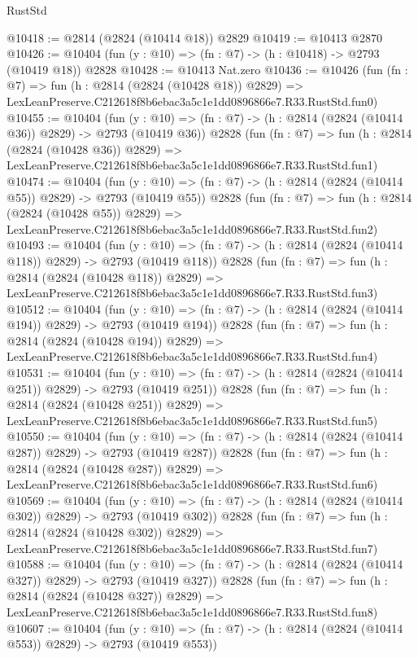 \begin{lexlean}{RustStd}
\begin{coremodule}
@10418 := @2814 (@2824 (@10414 @18)) @2829
@10419 := @10413 @2870
@10426 := @10404 (fun (y : @10) => (fn : @7) -> (h : @10418) -> @2793 (@10419 @18)) @2828
@10428 := @10413 Nat.zero
@10436 := @10426
    (fun (fn : @7) =>
    fun (h : @2814 (@2824 (@10428 @18)) @2829) =>
    LexLeanPreserve.C212618f8b6ebac3a5c1e1dd0896866e7.R33.RustStd.fun0)
@10455 := @10404
    (fun (y : @10) => (fn : @7) -> (h : @2814 (@2824 (@10414 @36)) @2829) -> @2793 (@10419 @36))
    @2828
    (fun (fn : @7) =>
    fun (h : @2814 (@2824 (@10428 @36)) @2829) =>
    LexLeanPreserve.C212618f8b6ebac3a5c1e1dd0896866e7.R33.RustStd.fun1)
@10474 := @10404
    (fun (y : @10) => (fn : @7) -> (h : @2814 (@2824 (@10414 @55)) @2829) -> @2793 (@10419 @55))
    @2828
    (fun (fn : @7) =>
    fun (h : @2814 (@2824 (@10428 @55)) @2829) =>
    LexLeanPreserve.C212618f8b6ebac3a5c1e1dd0896866e7.R33.RustStd.fun2)
@10493 := @10404
    (fun (y : @10) => (fn : @7) -> (h : @2814 (@2824 (@10414 @118)) @2829) -> @2793 (@10419 @118))
    @2828
    (fun (fn : @7) =>
    fun (h : @2814 (@2824 (@10428 @118)) @2829) =>
    LexLeanPreserve.C212618f8b6ebac3a5c1e1dd0896866e7.R33.RustStd.fun3)
@10512 := @10404
    (fun (y : @10) => (fn : @7) -> (h : @2814 (@2824 (@10414 @194)) @2829) -> @2793 (@10419 @194))
    @2828
    (fun (fn : @7) =>
    fun (h : @2814 (@2824 (@10428 @194)) @2829) =>
    LexLeanPreserve.C212618f8b6ebac3a5c1e1dd0896866e7.R33.RustStd.fun4)
@10531 := @10404
    (fun (y : @10) => (fn : @7) -> (h : @2814 (@2824 (@10414 @251)) @2829) -> @2793 (@10419 @251))
    @2828
    (fun (fn : @7) =>
    fun (h : @2814 (@2824 (@10428 @251)) @2829) =>
    LexLeanPreserve.C212618f8b6ebac3a5c1e1dd0896866e7.R33.RustStd.fun5)
@10550 := @10404
    (fun (y : @10) => (fn : @7) -> (h : @2814 (@2824 (@10414 @287)) @2829) -> @2793 (@10419 @287))
    @2828
    (fun (fn : @7) =>
    fun (h : @2814 (@2824 (@10428 @287)) @2829) =>
    LexLeanPreserve.C212618f8b6ebac3a5c1e1dd0896866e7.R33.RustStd.fun6)
@10569 := @10404
    (fun (y : @10) => (fn : @7) -> (h : @2814 (@2824 (@10414 @302)) @2829) -> @2793 (@10419 @302))
    @2828
    (fun (fn : @7) =>
    fun (h : @2814 (@2824 (@10428 @302)) @2829) =>
    LexLeanPreserve.C212618f8b6ebac3a5c1e1dd0896866e7.R33.RustStd.fun7)
@10588 := @10404
    (fun (y : @10) => (fn : @7) -> (h : @2814 (@2824 (@10414 @327)) @2829) -> @2793 (@10419 @327))
    @2828
    (fun (fn : @7) =>
    fun (h : @2814 (@2824 (@10428 @327)) @2829) =>
    LexLeanPreserve.C212618f8b6ebac3a5c1e1dd0896866e7.R33.RustStd.fun8)
@10607 := @10404
    (fun (y : @10) => (fn : @7) -> (h : @2814 (@2824 (@10414 @553)) @2829) -> @2793 (@10419 @553))

\end{coremodule}
\end{lexlean}

